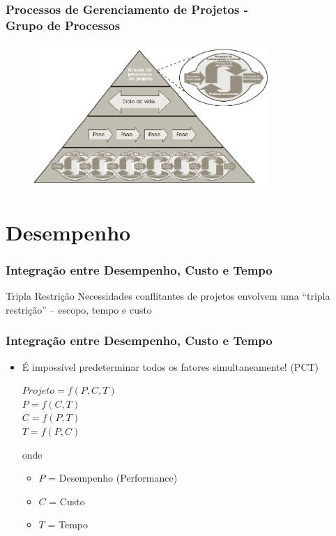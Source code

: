 \begin{frame}
 \frametitle{Processos de Gerenciamento de Projetos - \\
 \small{Grupo de Processos} }
 \begin{figure}
  \centering
  \includegraphics[width = 0.8\textwidth]{figs/fig1_4.png}
 \end{figure}
\end{frame}

\section{Desempenho}
\begin{frame}
 \frametitle{Integração entre Desempenho, Custo e Tempo}
 \begin{block}{Tripla Restrição}
  Necessidades conflitantes de projetos envolvem uma “tripla restrição” – escopo, tempo e custo
 \end{block}
\end{frame}

\begin{frame}
 \frametitle{Integração entre Desempenho, Custo e Tempo}
\begin{itemize}
 \item É impossível predeterminar todos os fatores simultaneamente! (PCT)
 \begin{block}{}
 $Projeto = f(P,C,T)$ \\
 $P = f(C,T)$ \\
 $C = f(P,T)$ \\ 
 $T = f(P,C)$
 \end{block}
 onde
 \begin{itemize}
  \item  $P$ = Desempenho (Performance)
  \item $C$ = Custo
  \item $T$ = Tempo
 \end{itemize}

\end{itemize}
\end{frame}

